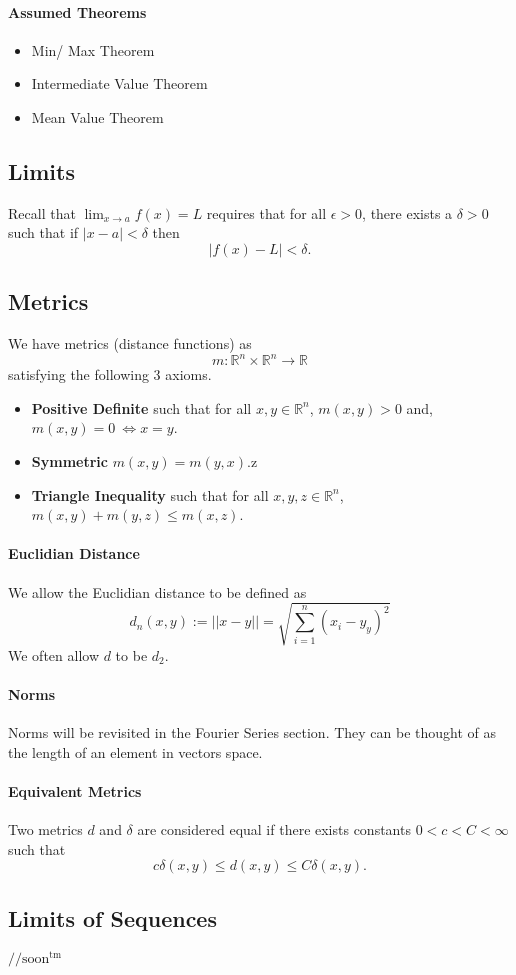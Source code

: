 \documentclass[12pt, letterpaper]{article}
\begin{document}
    \paragraph{Assumed Theorems}
    \begin{itemize}
        \item Min/ Max Theorem
        \item Intermediate Value Theorem
        \item Mean Value Theorem
    \end{itemize}
    
    \subsection{Limits}
    Recall that \(\lim_{x\to a} f(x) = L\) requires that for all
    \(\epsilon > 0\), there exists a \(\delta > 0\) such that
    if \(|x-a| < \delta\)
    then
    \[|f(x) - L|  < \delta.\]
    
    
    
    \subsection{Metrics}
    We have metrics (distance functions) as
    \[m: \mathbb{R}^n\times\mathbb{R}^n \to \mathbb{R}\]
    satisfying the following 3 axioms.
    \begin{itemize}
        \item \textbf{Positive Definite} such that for all \(x,y\in\mathbb{R}^n\),
        \(m(x,y) > 0\) and, \(m(x,y) = 0\ \Leftrightarrow x = y\).
        \item \textbf{Symmetric} \(m(x,y) = m(y, x)\).z
        \item \textbf{Triangle Inequality} such that for all \(x,y,z\in\mathbb{R}^n\),
        \(m(x,y) + m(y, z) \leq m(x, z)\).
    \end{itemize}

    \paragraph{Euclidian Distance}
    We allow the Euclidian distance to be defined as
    \[d_n(x,y) := ||x-y|| = \sqrt{\sum_{i=1}^{n} (x_i - y_y)^2}\]
    We often allow \(d\) to be \(d_2\).

    \paragraph{Norms} Norms will be revisited in the Fourier Series section. They can be thought of as the length of an element in vectors space.

    \paragraph{Equivalent Metrics}
    Two metrics \(d\) and \(\delta\) are considered equal if 
    there exists constants \(0 < c < C < \infty\) such that
    \[ c\delta (x,y) \leq d(x,y) \leq C \delta(x, y).\]
    
    \subsection{Limits of Sequences}
    \(//\text{soon}^\text{tm}\)
\end{document}
